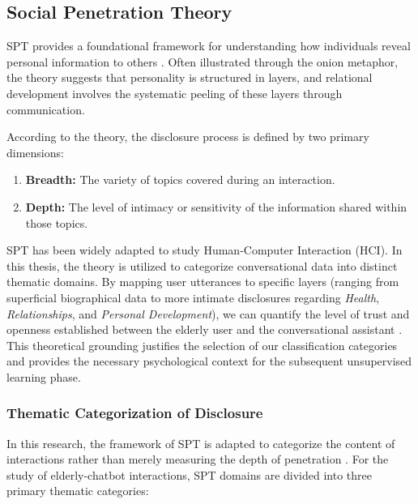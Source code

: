 \subsection{Social Penetration Theory}


SPT provides a foundational framework for understanding how individuals reveal personal information to others \cite{Altman1973}. Often illustrated through the onion metaphor, the theory suggests that personality is structured in layers, and relational development involves the systematic peeling of these layers through communication. \cite{zhang2023identifying}

According to the theory, the disclosure process is defined by two primary dimensions: %
\begin{enumerate}
    \item \textbf{Breadth:} The variety of \gls{topic}s covered during an interaction.
    \item \textbf{Depth:} The level of intimacy or sensitivity of the information shared within those topics.
\end{enumerate}

SPT has been widely adapted to study Human-Computer Interaction (HCI). In this thesis, the theory is utilized to categorize conversational data into distinct thematic domains. By mapping user utterances to specific layers (ranging from superficial biographical data to more intimate disclosures regarding \textit{Health}, \textit{Relationships}, and \textit{Personal Development}), we can quantify the level of trust and openness established between the elderly user and the conversational assistant \cite{Yang2025}. This theoretical grounding justifies the selection of our classification categories and provides the necessary psychological context for the subsequent unsupervised learning phase.


\subsubsection{Thematic Categorization of Disclosure}

In this research, the framework of SPT is adapted to categorize the content of interactions rather than merely measuring the depth of penetration \cite{Laban2023}. For the study of elderly-chatbot interactions, SPT domains are divided into three primary thematic categories:

